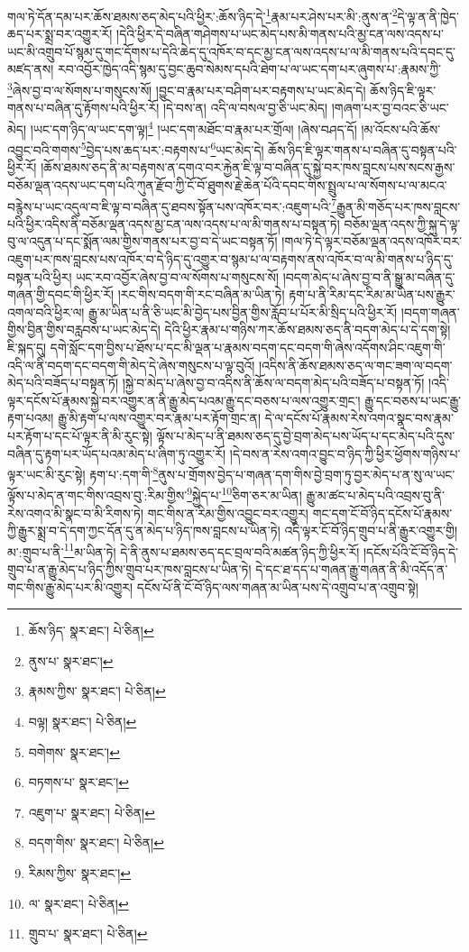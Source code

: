 གལ་ཏེ་དོན་དམ་པར་ཆོས་ཐམས་ཅད་མེད་པའི་ཕྱིར་:ཆོས་ཉིད་དེ་\footnote{ཆོས་ཉིད་  སྣར་ཐང་།  པེ་ཅིན། }རྣམ་པར་ཤེས་པར་མི་:ནུས་ན་\footnote{ནུས་པ་  སྣར་ཐང་། }དེ་ལྟ་ན་ནི་ཁྱེད་ཆད་པར་སྨྲ་བར་འགྱུར་རོ། །དེའི་ཕྱིར་དེ་བཞིན་གཤེགས་པ་ཡང་མེད་པས་མི་གནས་པའི་མྱ་ངན་ལས་འདས་པ་ཡང་མི་འགྲུབ་པོ་སྙམ་དུ་གང་དོགས་པ་དེའི་ཆེད་དུ་འཁོར་བ་དང་མྱ་ངན་ལས་འདས་པ་ལ་མི་གནས་པའི་དབང་དུ་མཛད་ནས། རབ་འབྱོར་ཁྱེད་འདི་སྙམ་དུ་བྱང་ཆུབ་སེམས་དཔའི་ཐེག་པ་ལ་ཡང་དག་པར་ཞུགས་པ་:རྣམས་ཀྱི་\footnote{རྣམས་ཀྱིས་  སྣར་ཐང་།  པེ་ཅིན། }ཞེས་བྱ་བ་ལ་སོགས་པ་གསུངས་སོ། །བྱུང་བ་རྣམ་པར་བཤིག་པར་བརྟགས་པ་ཡང་མེད་དེ། ཆོས་ཉིད་ཇི་ལྟར་གནས་པ་བཞིན་དུ་རྟོགས་པའི་ཕྱིར་རོ། །དེ་བས་ན། འདི་ལ་བསལ་བྱ་ཅི་ཡང་མེད། །གཞག་པར་བྱ་བའང་ཅི་ཡང་མེད། །ཡང་དག་ཉིད་ལ་ཡང་དག་ལྟ།\footnote{བལྟ།  སྣར་ཐང་།  པེ་ཅིན། } །ཡང་དག་མཐོང་བ་རྣམ་པར་གྲོལ། །ཞེས་བཤད་དོ། །མ་འོངས་པའི་ཆོས་འབྱུང་བའི་གགས་\footnote{བགེགས་  སྣར་ཐང་། }བྱེད་པས་ཆད་པར་:བརྟགས་པ་\footnote{བཏགས་པ་  སྣར་ཐང་། }ཡང་མེད་དེ། ཆོས་ཉིད་ཇི་ལྟར་གནས་པ་བཞིན་དུ་བསྟན་པའི་ཕྱིར་རོ། །ཆོས་ཐམས་ཅད་ནི་མ་བརྟགས་ན་དགའ་བར་རྐྱེན་ཇི་ལྟ་བ་བཞིན་དུ་སྐྱེ་བར་ཁས་བླངས་པས་སངས་རྒྱས་བཅོམ་ལྡན་འདས་ཡང་དག་པའི་ཀུན་རྫོབ་ཀྱི་ངོ་བོ་ཐུགས་རྗེ་ཆེན་པོའི་དབང་གིས་སྤྲུལ་པ་ལ་སོགས་པ་ལ་མངའ་བརྙེས་པ་ཡང་འདུལ་བ་ཇི་ལྟ་བ་བཞིན་དུ་ཐབས་སྟོན་པས་འཁོར་བར་:འཇུག་པའི་\footnote{འཇུག་པ་  སྣར་ཐང་།  པེ་ཅིན། }རྒྱུན་མི་གཅོད་པར་ཁས་བླངས་པའི་ཕྱིར་འདིས་ནི་བཅོམ་ལྡན་འདས་མྱ་ངན་ལས་འདས་པ་ལ་མི་གནས་པ་བསྟན་ཏེ། བཅོམ་ལྡན་འདས་ཀྱི་སྐུ་དེ་ལྟ་བུ་ལ་འདུན་པ་དང་སྨོན་ལམ་གྱིས་གནས་པར་བྱ་བ་དེ་ཡང་བསྟན་ཏོ། །གལ་ཏེ་དེ་ལྟར་བཅོམ་ལྡན་འདས་འཁོར་བར་འཇུག་པར་ཁས་བླངས་པས་འཁོར་བ་དེ་ཉིད་དུ་འགྱུར་བ་སྙམ་པ་ལ་བརྟགས་ནས་འཁོར་བ་ལ་མི་གནས་པ་ཉིད་དུ་བསྟན་པའི་ཕྱིར། ཡང་རབ་འབྱོར་ཞེས་བྱ་བ་ལ་སོགས་པ་གསུངས་སོ། །བདག་མེད་པ་ཞེས་བྱ་བ་ནི་སྒྱུ་མ་བཞིན་དུ་གཞན་གྱི་དབང་གི་ཕྱིར་རོ། །རང་གིས་བདག་གི་རང་བཞིན་མ་ཡིན་ཏེ། རྟག་པ་ནི་རིམ་དང་རིམ་མ་ཡིན་པས་རྒྱུར་འགལ་བའི་ཕྱིར་ལ། རྒྱུ་མ་ཡིན་པ་ནི་ཅི་ཡང་མི་བྱེད་པས་བྱིན་གྱིས་རློབ་པ་པོར་མི་སྲིད་པའི་ཕྱིར་རོ། །བདག་གཞན་གྱིས་བྱིན་གྱིས་བརླབས་པ་ཡང་མེད་དེ། དེའི་ཕྱིར་རྣམ་པ་གཉིས་ཀར་ཆོས་ཐམས་ཅད་ནི་བདག་མེད་པ་དེ་དག་སྟེ། ཇི་སྐད་དུ། དགེ་སློང་དག་བྱིས་པ་ཐོས་པ་དང་མི་ལྡན་པ་རྣམས་བདག་དང་བདག་གི་ཞེས་འདོགས་ཤིང་འཇུག་གི་འདི་ལ་ནི་བདག་དང་བདག་གི་མེད་དེ་ཞེས་གསུངས་པ་ལྟ་བུའོ། །འདིས་ནི་ཆོས་ཐམས་ཅད་ལ་གང་ཟག་ལ་བདག་མེད་པའི་བཟོད་པ་བསྟན་ཏོ། །སྐྱེ་བ་མེད་པ་ཞེས་བྱ་བ་འདིས་ནི་ཆོས་ལ་བདག་མེད་པའི་བཟོད་པ་བསྟན་ཏོ། །འདི་ལྟར་དངོས་པོ་རྣམས་སྐྱེ་བར་འགྱུར་ན་ནི་རྒྱུ་མེད་པའམ་རྒྱུ་དང་བཅས་པ་ལས་འགྱུར་གྲང་། རྒྱུ་དང་བཅས་པ་ཡང་རྒྱུ་རྟག་པའམ། རྒྱུ་མི་རྟག་པ་ལས་འགྱུར་བར་རྣམ་པར་རྟོག་གྲང་ན། དེ་ལ་དངོས་པོ་རྣམས་རེས་འགའ་སྣང་བས་རྣམ་པར་རྟོག་པ་དང་པོ་ལྟར་ནི་མི་རུང་སྟེ། ལྟོས་པ་མེད་པ་ནི་ཐམས་ཅད་དུ་བྱེ་བྲག་མེད་པས་ཡོད་པ་དང་མེད་པའི་དུས་བཞིན་དུ་རྟག་པར་ཡོད་པའམ་མེད་པ་ཞིག་ཏུ་འགྱུར་རོ། །དེ་བས་ན་རེས་འགའ་བྱུང་བ་ཉིད་ཀྱི་ཕྱིར་ཕྱོགས་གཉིས་པ་ལྟར་ཡང་མི་རུང་སྟེ། རྟག་པ་:དག་གི་\footnote{བདག་གིས་  སྣར་ཐང་།  པེ་ཅིན། }ནུས་པ་གྲོགས་བྱེད་པ་གཞན་དག་གིས་བྱེ་བྲག་ཏུ་བྱར་མེད་པ་ན་སུ་ལ་ཡང་ལྟོས་པ་མེད་ན་གང་གིས་འབྲས་བུ་:རིམ་གྱིས་\footnote{རིམས་ཀྱིས་  སྣར་ཐང་། }སྐྱེད་པ་\footnote{ལ་  སྣར་ཐང་།  པེ་ཅིན། }ཅིག་ཅར་མ་ཡིན། རྒྱུ་མ་ཚང་པ་མེད་པའི་འབྲས་བུ་ནི་རེས་འགའ་མི་སྣང་བ་མི་རིགས་ཏེ། གང་གིས་ན་རིམ་གྱིས་འབྱུང་བར་འགྱུར། གང་དག་ངོ་བོ་ཉིད་དངོས་པོ་རྣམས་ཀྱི་རྒྱུར་སྨྲ་བ་དེ་དག་ཀྱང་དོན་དུ་ན་མེད་པ་ཉིད་ཁས་བླངས་པ་ཡིན་ཏེ། འདི་ལྟར་ངོ་བོ་ཉིད་གྲུབ་པ་ནི་རྒྱུར་འགྱུར་གྱི། མ་:གྲུབ་པ་ནི་\footnote{གྲུབ་པ་  སྣར་ཐང་།  པེ་ཅིན། }མ་ཡིན་ཏེ། དེ་ནི་ནུས་པ་ཐམས་ཅད་དང་བྲལ་བའི་མཚན་ཉིད་ཀྱི་ཕྱིར་རོ། །དངོས་པོའི་ངོ་བོ་ཉིད་དེ་གྲུབ་པ་ན་རྒྱུ་མེད་པ་ཉིད་ཀྱིས་གྲུབ་པར་ཁས་བླངས་པ་ཡིན་ཏེ། དེ་དང་ཐ་དད་པ་གཞན་རྒྱུ་གཞན་ནི་མི་འདོད་ན་གང་གིས་རྒྱུ་མེད་པར་མི་འགྱུར། དངོས་པོ་ནི་ངོ་བོ་ཉིད་ལས་གཞན་མ་ཡིན་པས་དེ་འགྲུབ་པ་ན་འགྲུབ་སྟེ། 